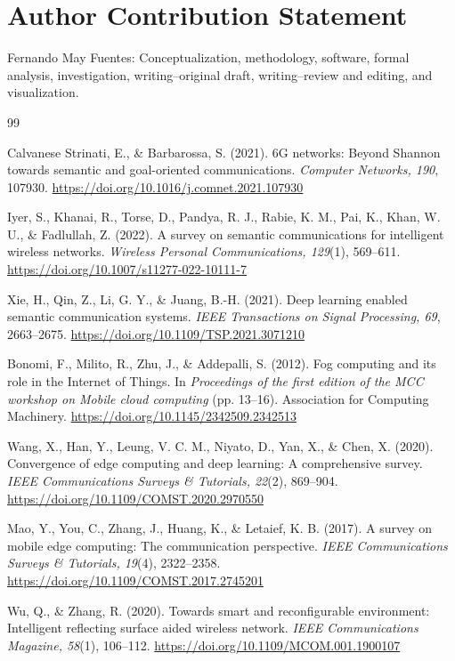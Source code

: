\documentclass{BVP_CINC}
\begin{document}
\section*{Author Contribution Statement}
Fernando May Fuentes: Conceptualization, methodology, software, formal analysis, investigation, writing--original draft, writing--review and editing, and visualization.

\begin{thebibliography}{99}

 Calvanese Strinati, E., \& Barbarossa, S. (2021). 6G networks: Beyond Shannon towards semantic and goal-oriented communications. \textit{Computer Networks, 190}, 107930. \url{https://doi.org/10.1016/j.comnet.2021.107930}

 Iyer, S., Khanai, R., Torse, D., Pandya, R. J., Rabie, K. M., Pai, K., Khan, W. U., \& Fadlullah, Z. (2022). A survey on semantic communications for intelligent wireless networks. \textit{Wireless Personal Communications, 129}(1), 569--611. \url{https://doi.org/10.1007/s11277-022-10111-7}

 Xie, H., Qin, Z., Li, G. Y., \& Juang, B.-H. (2021). Deep learning enabled semantic communication systems. \textit{IEEE Transactions on Signal Processing, 69}, 2663--2675. \url{https://doi.org/10.1109/TSP.2021.3071210}

 Bonomi, F., Milito, R., Zhu, J., \& Addepalli, S. (2012). Fog computing and its role in the Internet of Things. In \textit{Proceedings of the first edition of the MCC workshop on Mobile cloud computing} (pp. 13--16). Association for Computing Machinery. \url{https://doi.org/10.1145/2342509.2342513}

 Wang, X., Han, Y., Leung, V. C. M., Niyato, D., Yan, X., \& Chen, X. (2020). Convergence of edge computing and deep learning: A comprehensive survey. \textit{IEEE Communications Surveys \& Tutorials, 22}(2), 869--904. \url{https://doi.org/10.1109/COMST.2020.2970550}

 Mao, Y., You, C., Zhang, J., Huang, K., \& Letaief, K. B. (2017). A survey on mobile edge computing: The communication perspective. \textit{IEEE Communications Surveys \& Tutorials, 19}(4), 2322--2358. \url{https://doi.org/10.1109/COMST.2017.2745201}

 Wu, Q., \& Zhang, R. (2020). Towards smart and reconfigurable environment: Intelligent reflecting surface aided wireless network. \textit{IEEE Communications Magazine, 58}(1), 106--112. \url{https://doi.org/10.1109/MCOM.001.1900107}


\end{thebibliography}
\end{document}
